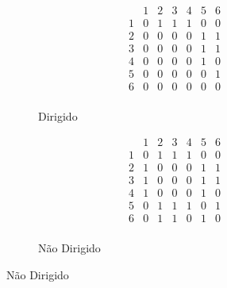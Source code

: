 \documentclass{article}
\begin{document}
        \begin{figure}[H]
            \begin{minipage}{0.8\textwidth}
                \centering
                \captionsetup{labelformat=empty}
                \caption{Matrizes de Adjacência}
            \end{minipage}
            \centering
            \begin{subfigure}{0.30\textwidth}
                \[
                    \begin{array}{c|cccccc}
                          & 1 & 2 & 3 & 4 & 5 & 6 \\
                    \hline
                        1 & 0 & 1 & 1 & 1 & 0 & 0 \\
                        2 & 0 & 0 & 0 & 0 & 1 & 1 \\
                        3 & 0 & 0 & 0 & 0 & 1 & 1 \\
                        4 & 0 & 0 & 0 & 0 & 1 & 0 \\
                        5 & 0 & 0 & 0 & 0 & 0 & 1 \\
                        6 & 0 & 0 & 0 & 0 & 0 & 0 \\
                    \end{array}
                \]
                \caption{Dirigido}
            \end{subfigure}
            \hspace{1.5cm}
            \centering
            \begin{subfigure}{0.30\textwidth}
                \[
                    \begin{array}{c|cccccc}
                          & 1 & 2 & 3 & 4 & 5 & 6 \\
                    \hline
                        1 & 0 & 1 & 1 & 1 & 0 & 0 \\
                        2 & 1 & 0 & 0 & 0 & 1 & 1 \\
                        3 & 1 & 0 & 0 & 0 & 1 & 1 \\
                        4 & 1 & 0 & 0 & 0 & 1 & 0 \\
                        5 & 0 & 1 & 1 & 1 & 0 & 1 \\
                        6 & 0 & 1 & 1 & 0 & 1 & 0 \\
                    \end{array}
                \]
                \caption{Não Dirigido}
            \end{subfigure}
        \end{figure}
\end{document}
